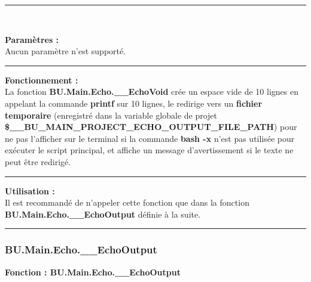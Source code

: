 \documentclass[a4paper,10pt]{article}
\begin{document}

\par\noindent\rule{\textwidth}{0.4pt}\\

\begin{justify}
    \textbf{Paramètres :}\\[1\baselineskip]
    Aucun paramètre n'est supporté.
\end{justify}


\par\noindent\rule{\textwidth}{0.4pt}

\begin{justify}
    \textbf{Fonctionnement :}\\[1\baselineskip]
    La fonction \textbf{\color{func}BU.Main.Echo.\_\_EchoVoid} crée un espace vide de 10 lignes en appelant la commande \textbf{\color{cmds}printf} sur 10 lignes, le redirige vers un \textbf{\color{path}fichier temporaire} (enregistré dans la variable globale de projet \textbf{\color{vars}\$\_\_BU\_MAIN\_PROJECT\_ECHO\_OUTPUT\_FILE\_PATH}) pour ne pas l'afficher sur le terminal si la commande \textbf{\color{cmds}bash -x} n'est pas utilisée pour exécuter le script principal, et affiche un message d'avertissement si le texte ne peut être redirigé.
\end{justify}


\par\noindent\rule{\textwidth}{0.4pt}

\begin{justify}
    \textbf{Utilisation :}\\[1\baselineskip]
    Il est recommandé de n'appeler cette fonction que dans la fonction \textbf{\color{func}BU.Main.Echo.\_\_EchoOutput} définie à la suite.
\end{justify}



\color{sec3}\par\noindent\rule{\textwidth}{0.4pt}\color{text}\setlength{\parskip}{1em}

\color{sec3}
\subsubsection{BU.Main.Echo.\_\_EchoOutput}\color{text}

\begin{justify}
    \textbf{Fonction : \color{func}BU.Main.Echo.\_\_EchoOutput}
\end{justify}
\end{document}
